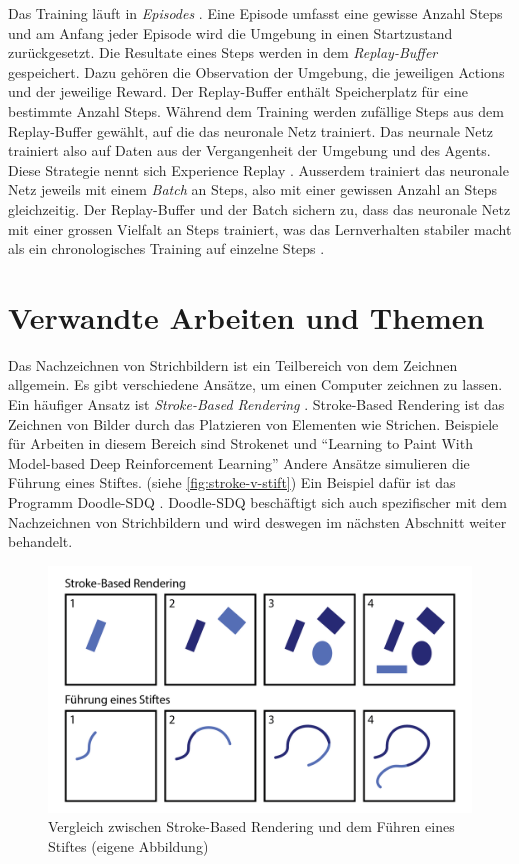 Das Training läuft in \emph{Episodes} \cite[S. 14]{sutton_reinforcement_2014}.
Eine Episode umfasst eine gewisse Anzahl Steps und am Anfang jeder Episode wird
die Umgebung in einen Startzustand zurückgesetzt. Die Resultate eines Steps
werden in dem \emph{Replay-Buffer} gespeichert. Dazu gehören die Observation der
Umgebung, die jeweiligen Actions und der jeweilige Reward. Der Replay-Buffer enthält Speicherplatz
für eine bestimmte Anzahl Steps. Während dem Training werden zufällige Steps aus
dem Replay-Buffer gewählt, auf die das neuronale Netz trainiert. Das neurnale
Netz trainiert also auf Daten aus der Vergangenheit der Umgebung und des Agents.
Diese Strategie nennt sich Experience Replay \cite[S. 5]{mnih_playing_2013}.
Ausserdem trainiert das neuronale Netz jeweils mit einem \emph{Batch} an Steps,
also mit einer gewissen Anzahl an Steps gleichzeitig. Der Replay-Buffer und der
Batch sichern zu, dass das neuronale Netz mit einer grossen Vielfalt an Steps
trainiert, was das Lernverhalten stabiler macht als ein chronologisches Training
auf einzelne Steps \cite{phd_how_2021}.


\section{Verwandte Arbeiten und Themen}\label{chap:t_ver} Das Nachzeichnen von
Strichbildern ist ein Teilbereich von dem Zeichnen allgemein. Es gibt
verschiedene Ansätze, um einen Computer zeichnen zu lassen. Ein häufiger Ansatz
ist \emph{Stroke-Based Rendering} \cite{aaron_hertzmann_stroke-based_2002}. Stroke-Based
Rendering ist das Zeichnen von Bilder durch das Platzieren von Elementen wie
Strichen. Beispiele für Arbeiten in diesem Bereich sind Strokenet
\cite{zheng_strokenet_2018} und ``Learning to Paint With Model-based Deep
Reinforcement Learning'' \cite{huang_learning_2019} Andere Ansätze simulieren
die Führung eines Stiftes. (siehe \autoref{fig:stroke-v-stift}) Ein Beispiel
dafür ist das Programm Doodle-SDQ \cite{zhou_learning_2018}. Doodle-SDQ
beschäftigt sich auch spezifischer mit dem Nachzeichnen von Strichbildern und
wird deswegen im nächsten Abschnitt weiter behandelt.

\begin{figure}[!ht]
    \centering
    \includegraphics[width=\textwidth]{images/theorie/stroke-v-stift.png}
    \caption{Vergleich zwischen Stroke-Based Rendering und dem Führen eines Stiftes (eigene Abbildung)}
    \label{fig:stroke-v-stift}
\end{figure}

